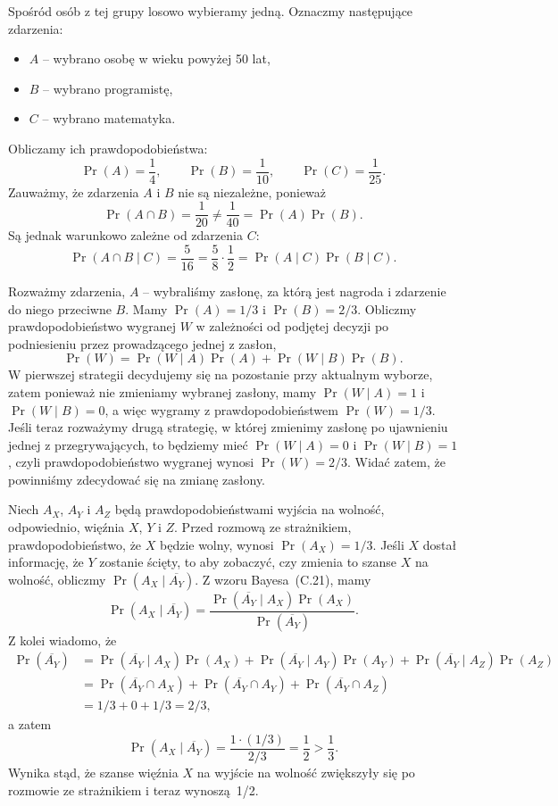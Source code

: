 Spośród osób z tej grupy losowo wybieramy jedną. Oznaczmy następujące zdarzenia:
\begin{itemize}
	\item $A$ -- wybrano osobę w wieku powyżej 50 lat,
	\item $B$ -- wybrano programistę,
	\item $C$ -- wybrano matematyka.
\end{itemize}
Obliczamy ich prawdopodobieństwa:
\[
	\Pr(A) = \frac{1}{4}, \qquad \Pr(B) = \frac{1}{10}, \qquad \Pr(C) = \frac{1}{25}.
\]
Zauważmy, że zdarzenia $A$ i $B$ nie są niezależne, ponieważ
\[
	\Pr(A\cap B) = \frac{1}{20} \ne \frac{1}{40} = \Pr(A)\Pr(B).
\]
Są jednak warunkowo zależne od zdarzenia $C$:
\[
	\Pr(A\cap B\mid C) = \frac{5}{16} = \frac{5}{8}\cdot\frac{1}{2} = \Pr(A\mid C)\Pr(B\mid C).
\]

\exercise{} %
\noindent Rozważmy zdarzenia, $A$ -- wybraliśmy zasłonę, za którą jest nagroda i zdarzenie do niego przeciwne $B$. Mamy $\Pr(A)=1/3$ i $\Pr(B)=2/3$. Obliczmy prawdopodobieństwo wygranej $W$ w zależności od podjętej decyzji po podniesieniu przez prowadzącego jednej z zasłon,
\[
	\Pr(W) = \Pr(W\mid A)\Pr(A)+\Pr(W\mid B)\Pr(B).
\]
W pierwszej strategii decydujemy się na pozostanie przy aktualnym wyborze, zatem ponieważ nie zmieniamy wybranej zasłony, mamy $\Pr(W\mid A)=1$ i~$\Pr(W\mid B)=0$, a więc wygramy z prawdopodobieństwem $\Pr(W)=1/3$. Jeśli teraz rozważymy drugą strategię, w której zmienimy zasłonę po ujawnieniu jednej z przegrywających, to będziemy mieć $\Pr(W\mid A)=0$ i $\Pr(W\mid B)=1$, czyli prawdopodobieństwo wygranej wynosi $\Pr(W)=2/3$. Widać zatem, że powinniśmy zdecydować się na zmianę zasłony.

\exercise{} %
\noindent Niech $A_X$, $A_Y$ i $A_Z$ będą prawdopodobieństwami wyjścia na wolność, odpowiednio, więźnia $X$, $Y$ i $Z$. Przed rozmową ze strażnikiem, prawdopodobieństwo, że $X$ będzie wolny, wynosi $\Pr(A_X)=1/3$. Jeśli $X$ dostał informację, że $Y$ zostanie ścięty, to aby zobaczyć, czy zmienia to szanse $X$ na wolność, obliczmy $\Pr(A_X\mid\overline{A_Y})$. Z wzoru Bayesa~(C.21), mamy
\[
	\Pr(A_X\mid\overline{A_Y}) = \frac{\Pr(\overline{A_Y}\mid A_X)\Pr(A_X)}{\Pr(\overline{A_Y})}.
\]
Z kolei wiadomo, że
\begin{align*}
	\Pr(\overline{A_Y}) &= \Pr(\overline{A_Y}\mid A_X)\Pr(A_X)+\Pr(\overline{A_Y}\mid A_Y)\Pr(A_Y)+\Pr(\overline{A_Y}\mid A_Z)\Pr(A_Z) \\
	&= \Pr(\overline{A_Y}\cap A_X)+\Pr(\overline{A_Y}\cap A_Y)+\Pr(\overline{A_Y}\cap A_Z) \\
	&= 1/3+0+1/3 = 2/3,
\end{align*}
a zatem
\[
	\Pr(A_X\mid\overline{A_Y}) = \frac{1\cdot (1/3)}{2/3} = \frac{1}{2}>\frac{1}{3}.
\]
Wynika stąd, że szanse więźnia $X$ na wyjście na wolność zwiększyły się po rozmowie ze strażnikiem i teraz wynoszą~1/2.

